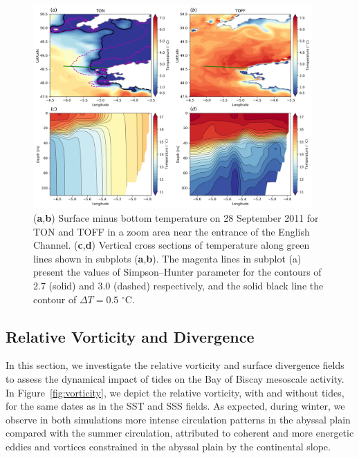 \documentclass[jmse,article,accept,moreauthors,pdftex]{Definitions/mdpi}
\begin{document}
\begin{figure}[H]
    \centering
    \includegraphics[width=0.95\textwidth]{Definitions/figure6.png}
    \caption{(\textbf{a},\textbf{b}) Surface minus bottom temperature on 28 September 2011 for TON and TOFF in a zoom area near the entrance of the English Channel. (\textbf{c},\textbf{d}) Vertical cross sections of temperature along green lines shown in subplots (\textbf{a},\textbf{b}). The magenta lines in subplot (a) present the values of Simpson--Hunter parameter for the contours of 2.7 (solid) and 3.0 (dashed) respectively, and the solid black line the contour of $\Delta T=0.5$ $^\circ$C.}
    \label{fig:ushant}
\end{figure}
\subsection{Relative Vorticity and Divergence}
\label{section:3.2}

In this section, we investigate the relative vorticity and surface divergence fields to assess the dynamical impact of tides on the Bay of Biscay mesoscale activity. In Figure~\ref{fig:vorticity}, we depict the relative vorticity, with and without tides, for the same dates as in the SST and SSS fields. As expected, during winter, we observe in both simulations more intense circulation patterns in the abyssal plain compared with the summer circulation, attributed to coherent and more energetic eddies and vortices constrained in the abyssal plain by the continental slope. 
\end{document}
